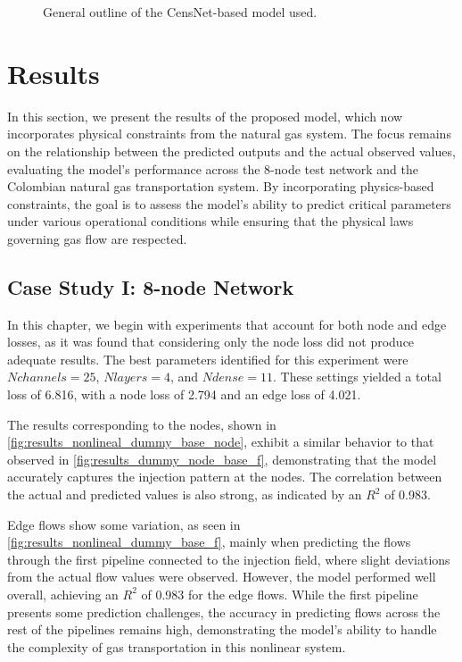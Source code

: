 \begin{figure}
    \centering
    \setlength{}        
    \setlength{}
    \resizebox{\figurewidth}{\figureheight}{}
    \caption{General outline of the CensNet-based model used.}
        \label{fig:nonlineal_model_description}
\end{figure}

\section{Results}


In this section, we present the results of the proposed model, which now incorporates physical constraints from the natural gas system. The focus remains on the relationship between the predicted outputs and the actual observed values, evaluating the model's performance across the 8-node test network and the Colombian natural gas transportation system. By incorporating physics-based constraints, the goal is to assess the model's ability to predict critical parameters under various operational conditions while ensuring that the physical laws governing gas flow are respected.

\subsection{Case Study I: 8-node Network}



In this chapter, we begin with experiments that account for both node and edge losses, as it was found that considering only the node loss did not produce adequate results. The best parameters identified for this experiment were $N channels=25$, $N layers =4$, and $N dense = 11$. These settings yielded a total loss of 6.816, with a node loss of 2.794 and an edge loss of 4.021.

The results corresponding to the nodes, shown in \cref{fig:results_nonlineal_dummy_base_node}, exhibit a similar behavior to that observed in 
\cref{fig:results_dummy_node_base_f}, demonstrating that the model accurately captures the injection pattern at the nodes. The correlation between the actual and predicted values is also strong, as indicated by an $R^2$ of 0.983.

Edge flows show some variation, as seen in \cref{fig:results_nonlineal_dummy_base_f}, mainly when predicting the flows through the first pipeline connected to the injection field, where slight deviations from the actual flow values were observed. However, the model performed well overall, achieving an $R^2$ of 0.983 for the edge flows. While the first pipeline presents some prediction challenges, the accuracy in predicting flows across the rest of the pipelines remains high, demonstrating the model's ability to handle the complexity of gas transportation in this nonlinear system.



